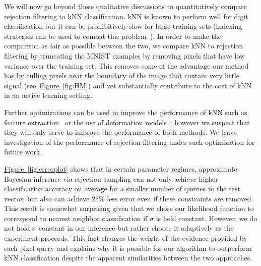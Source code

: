 \documentclass[twoside]{article}
\newcommand{\eq}[1]{\hyperref[eq:#1]{(\ref*{eq:#1})}}
\newcommand{\fig}[1]{\hyperref[fig:#1]{Figure~\ref*{fig:#1}}}
\newcommand{\alg}[1]{\hyperref[alg:#1]{Algorithm~\ref*{alg:#1}}}
\newcommand{\CRej}{\text{rejection filtering}}
\begin{document}
We will now go beyond these qualitative discussions to quantitatively compare rejection filtering to kNN classification.  kNN is known to perform well for digit classification but it can be prohibitively slow for
large training sets (indexing strategies can be used to combat this problem~\cite{yu2001indexing}).  In order to make the comparison as fair as possible between the two, we compare kNN to rejection filtering by truncating the 
MNIST examples by removing pixels that have low variance over the training set.  This removes some of the advantage our method has by culling pixels near
the boundary of the image that contain very little signal  (see~\fig{HM}) and yet substantially contribute to the cost of kNN in an active learning setting.

Further optimizations can be used to improve the performance of kNN such as feature extraction~\cite{zhang2006svm,weinberger2008fast,min2009deep} or the use of 
deformation models~\cite{keysers2007deformation};
however we suspect that they will only serve to improve the performance of both methods. We leave investigation of the performance of rejection filtering under such optimization
for future work.

\fig{errorplot} shows that in certain parameter regimes, approximate Bayesian inference via rejection sampling can not only achieve higher classification accuracy on average for a smaller
number of queries to the test vector, but also can achieve $25\%$ less error even if these constraints are removed.  This result is somewhat surprising given that we chose our likelihood function to correspond to nearest neighbor classification if $\sigma$ is held constant.  However, we do not hold $\sigma$ constant in our inference but rather choose it adaptively as the experiment proceeds.  This fact changes the weight of the evidence provided by each pixel query and explains why it is possible for our algorithm to outperform kNN classification despite the apparent similarities between the two approaches.





%
\end{document}
